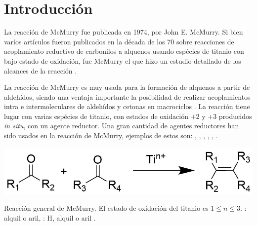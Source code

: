 \documentclass[fleqn,11pt]{SelfArx}
\begin{document}
\flushbottom %

\maketitle %


\thispagestyle{empty} %
\renewcommand{\tablename}{Tabla} 

\section*{Introducci\'on} %

La reacci\'on de McMurry fue publicada en 1974, por John E. McMurry. Si bien var\'ios art\'iculos fueron publicados en la d\'ecada de los 70 \cite{Mukaiyama1973, Mukaiyama1974} sobre reacciones de acoplamiento reductivo de carbonilos a alquenos usando esp\'ecies de titanio con bajo estado de oxidaci\'on, fue McMurry el que hizo un estudio detallado de los alcances de la reacci\'on \cite{Wang2010}.

La reacci\'on de McMurry es muy usada para la formaci\'on de alquenos a partir de aldeh\'idos, siendo una ventaja importante la posibilidad de realizar acoplamientos intra e intermoleculares de aldeh\'idos y cetonas en macrociclos \cite{Wang2010, Villiers1997}. La reacci\'on tiene lugar con varias esp\'ecies de titanio, con estados de oxidaci\'on $+2$ y $+3$ producidos \textit{in situ}, con un agente reductor. Una gran cantidad de agentes reductores han sido usados en la reacci\'on de McMurry, ejemplos de estos son: , , , , ,  \cite{Wang2010}.
\begin{scheme}[h]
	\centering
	\includegraphics[width=0.9\linewidth]{structures/generalreaction.png}
	\caption{Reacci\'on general de McMurry. El estado de oxidaci\'on del titanio es $1\leq n\leq3$. : alquil o aril, : H, alquil o aril \cite{Wang2010}.}
\end{scheme}
\end{document}
